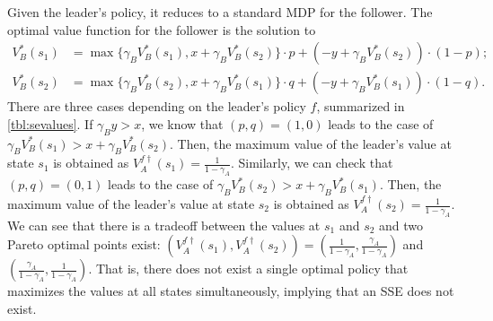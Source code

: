 \documentclass{acml}
\begin{document}
Given the leader's policy, it reduces to a standard MDP for the follower. 
The optimal value function for the follower is the solution to 
\begin{align*}
V_B^*(s_1) &= \max\{\gamma_B V_B^*(s_1), x + \gamma_B V_B^*(s_2)\} \cdot p + (-y + \gamma_B V_B^*(s_2)) \cdot (1 - p) ;
\\
V_B^*(s_2) &= \max\{\gamma_B V_B^*(s_2), x + \gamma_B V_B^*(s_1)\} \cdot q + (-y + \gamma_B V_B^*(s_1)) \cdot (1 - q) .
\end{align*}
There are three cases depending on the leader's policy $f$, summarized in \cref{tbl:sevalues}.
If $\gamma_B y > x$, we know that $(p, q) = (1, 0)$ leads to the case of $\gamma_B V_B^*(s_1) > x + \gamma_B V_B^*(s_2)$. Then, the maximum value of the leader's value at state $s_1$ is obtained as $V_A^{f\dag}(s_1) = \frac{1}{1 - \gamma_A}$. Similarly, we can check that $(p, q) = (0, 1)$ leads to the case of $\gamma_B V_B^*(s_2) > x + \gamma_B V_B^*(s_1)$. Then, the maximum value of the leader's value at state $s_2$ is obtained as $V_A^{f\dag}(s_2) = \frac{1}{1 - \gamma_A}$. 
We can see that there is a tradeoff between the values at $s_1$ and $s_2$ and two Pareto optimal points exist: $(V_A^{f\dag}(s_1), V_A^{f\dag}(s_2)) = (\frac{1}{1 - \gamma_A}, \frac{\gamma_A}{1 - \gamma_A})$ and $(\frac{\gamma_A}{1 - \gamma_A}, \frac{1}{1 - \gamma_A})$.
That is, there does not exist a single optimal policy that maximizes the values at all states simultaneously, implying that an SSE does not exist. 


\end{document}
